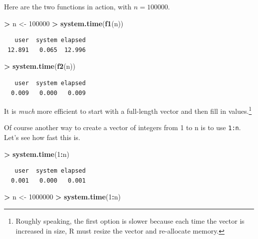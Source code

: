 \documentclass[
]{krantz}
\makeatletter
\newenvironment{Shaded}{\begin{snugshade}}{\end{snugshade}}
\newcommand{\DecValTok}[1]{\textcolor[rgb]{0.06,0.06,0.06}{#1}}
\newcommand{\KeywordTok}[1]{\textcolor[rgb]{0.27,0.27,0.27}{\textbf{#1}}}
\newcommand{\NormalTok}[1]{#1}
\newcommand{\OperatorTok}[1]{\textcolor[rgb]{0.43,0.43,0.43}{\textbf{#1}}}
\newcommand{\StringTok}[1]{\textcolor[rgb]{0.5,0.5,0.5}{#1}}
\newenvironment{kframe}{%
\medskip{}
\setlength{\fboxsep}{.8em}
 \def\at@end@of@kframe{}%
 \ifinner\ifhmode%
  \def\at@end@of@kframe{\end{minipage}}%
  \begin{minipage}{\columnwidth}%
 \fi\fi%
 \def\FrameCommand##1{\hskip\@totalleftmargin \hskip-\fboxsep
 \colorbox{shadecolor}{##1}\hskip-\fboxsep
     \hskip-\linewidth \hskip-\@totalleftmargin \hskip\columnwidth}%
 \MakeFramed {\advance\hsize-\width
   \@totalleftmargin\z@ \linewidth\hsize
   \@setminipage}}%
 {\par\unskip\endMakeFramed%
 \at@end@of@kframe}
\renewenvironment{Shaded}{\begin{kframe}}{\end{kframe}}
\makeatother
\begin{document}
Here are the two functions in action, with \(n = 100000\).

\begin{Shaded}
\begin{Highlighting}[]
\OperatorTok{\textgreater{}}\StringTok{ }\NormalTok{n \textless{}{-}}\StringTok{ }\DecValTok{100000}
\OperatorTok{\textgreater{}}\StringTok{ }\KeywordTok{system.time}\NormalTok{(}\KeywordTok{f1}\NormalTok{(n))}
\end{Highlighting}
\end{Shaded}

\begin{verbatim}
   user  system elapsed 
 12.891   0.065  12.996 
\end{verbatim}

\begin{Shaded}
\begin{Highlighting}[]
\OperatorTok{\textgreater{}}\StringTok{ }\KeywordTok{system.time}\NormalTok{(}\KeywordTok{f2}\NormalTok{(n))}
\end{Highlighting}
\end{Shaded}

\begin{verbatim}
   user  system elapsed 
  0.009   0.000   0.009 
\end{verbatim}

It is \emph{much} more efficient to start with a full-length vector and then fill in values.\footnote{Roughly speaking, the first option is slower because each time the vector is increased in size, R must resize the vector and re-allocate memory.}

Of course another way to create a vector of integers from 1 to n is to use \texttt{1:n}. Let's see how fast this is.

\begin{Shaded}
\begin{Highlighting}[]
\OperatorTok{\textgreater{}}\StringTok{ }\KeywordTok{system.time}\NormalTok{(}\DecValTok{1}\OperatorTok{:}\NormalTok{n)}
\end{Highlighting}
\end{Shaded}

\begin{verbatim}
   user  system elapsed 
  0.001   0.000   0.001 
\end{verbatim}

\begin{Shaded}
\begin{Highlighting}[]
\OperatorTok{\textgreater{}}\StringTok{ }\NormalTok{n \textless{}{-}}\StringTok{ }\DecValTok{1000000}
\OperatorTok{\textgreater{}}\StringTok{ }\KeywordTok{system.time}\NormalTok{(}\DecValTok{1}\OperatorTok{:}\NormalTok{n)      }
\end{Highlighting}
\end{Shaded}
\end{document}

